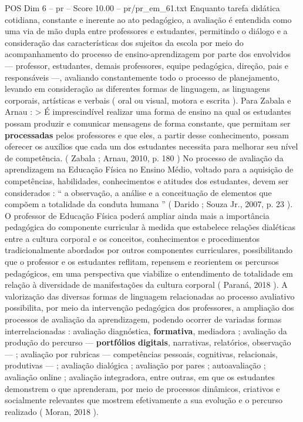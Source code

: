 \begin{textsample}{POS Dim 6 – pr – Score 10.00 – pr/pr\_em\_61.txt}
Enquanto tarefa didática cotidiana, constante e inerente ao ato pedagógico, a avaliação é entendida como uma via de mão dupla entre professores e estudantes, permitindo o diálogo e a consideração das características dos sujeitos da escola por meio do acompanhamento do processo de ensino-aprendizagem por parte dos envolvidos — professor, estudantes, demais professores, equipe pedagógica, direção, pais e responsáveis —, avaliando constantemente todo o processo de planejamento, levando em consideração as diferentes formas de linguagem, as linguagens corporais, artísticas e verbais ( oral ou visual, motora e escrita ).
Para Zabala e Arnau : > É imprescindível realizar uma forma de ensino na qual os estudantes possam produzir e comunicar mensagens de forma constante, que permitam ser \textbf{processadas} pelos professores e que eles, a partir desse conhecimento, possam oferecer os auxílios que cada um dos estudantes necessita para melhorar seu nível de competência. ( Zabala ; Arnau, 2010, p. 180 ) No processo de avaliação da aprendizagem na Educação Física no Ensino Médio, voltado para a aquisição de competências, habilidades, conhecimentos e atitudes dos estudantes, devem ser considerados : “ a observação, a análise e a conceituação de elementos que compõem a totalidade da conduta humana ” ( Darido ; Souza Jr., 2007, p. 23 ).
O professor de Educação Física poderá ampliar ainda mais a importância pedagógica do componente curricular à medida que estabelece relações dialéticas entre a cultura corporal e os conceitos, conhecimentos e procedimentos tradicionalmente abordados por outros componentes curriculares, possibilitando que o professor e os estudantes reflitam, repensem e reorientem os percursos pedagógicos, em uma perspectiva que viabilize o entendimento de totalidade em relação à diversidade de manifestações da cultura corporal ( Paraná, 2018 ).
A valorização das diversas formas de linguagem relacionadas ao processo avaliativo possibilita, por meio da intervenção pedagógica dos professores, a ampliação dos processos de avaliação da aprendizagem, podendo ocorrer de variadas formas interrelacionadas : avaliação diagnóstica, \textbf{formativa}, mediadora ; avaliação da produção do percurso — \textbf{portfólios} \textbf{digitais}, narrativas, relatórios, observação — ; avaliação por rubricas — competências pessoais, cognitivas, relacionais, produtivas — ; avaliação dialógica ; avaliação por pares ; autoavaliação ; avaliação online ; avaliação integradora, entre outras, em que os estudantes demonstrem o que aprenderam, por meio de processos dinâmicos, criativos e socialmente relevantes que mostrem efetivamente a sua evolução e o percurso realizado ( Moran, 2018 ).

\end{textsample}
